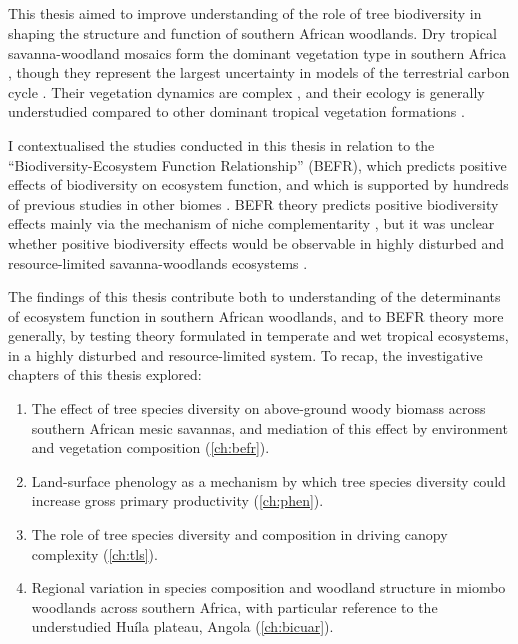 \begin{refsection}


\chapter{\chaptertitle}
\label{ch:discussion}

This thesis aimed to improve understanding of the role of tree biodiversity in shaping the structure and function of southern African woodlands. Dry tropical savanna-woodland mosaics form the dominant vegetation type in southern Africa \citep{Arino2010}, though they represent the largest uncertainty in models of the terrestrial carbon cycle \citep{Ahlstrom2015}. Their vegetation dynamics are complex \citep{Scholes1997}, and their ecology is generally understudied compared to other dominant tropical vegetation formations \citep{Hill2010}. 

I contextualised the studies conducted in this thesis in relation to the ``Biodiversity-Ecosystem Function Relationship'' (BEFR), which predicts positive effects of biodiversity on ecosystem function, and which is supported by hundreds of previous studies in other biomes \citep{Liang2016}. BEFR theory predicts positive biodiversity effects mainly via the mechanism of niche complementarity \citep{Cardinale2009}, but it was unclear whether positive biodiversity effects would be observable in highly disturbed and resource-limited savanna-woodlands ecosystems \citep{Tilman2014}. 

The findings of this thesis contribute both to understanding of the determinants of ecosystem function in southern African woodlands, and to BEFR theory more generally, by testing theory formulated in temperate and wet tropical ecosystems, in a highly disturbed and resource-limited system. To recap, the investigative chapters of this thesis explored: 

\begin{enumerate}
	\item{The effect of tree species diversity on above-ground woody biomass across southern African mesic savannas, and mediation of this effect by environment and vegetation composition (\autoref{ch:befr}).}
	\item{Land-surface phenology as a mechanism by which tree species diversity could increase gross primary productivity (\autoref{ch:phen}).}
	\item{The role of tree species diversity and composition in driving canopy complexity (\autoref{ch:tls}).}
	\item{Regional variation in species composition and woodland structure in miombo woodlands across southern Africa, with particular reference to the understudied Hu\'{i}la plateau, Angola (\autoref{ch:bicuar}).}
\end{enumerate}


\end{refsection}
